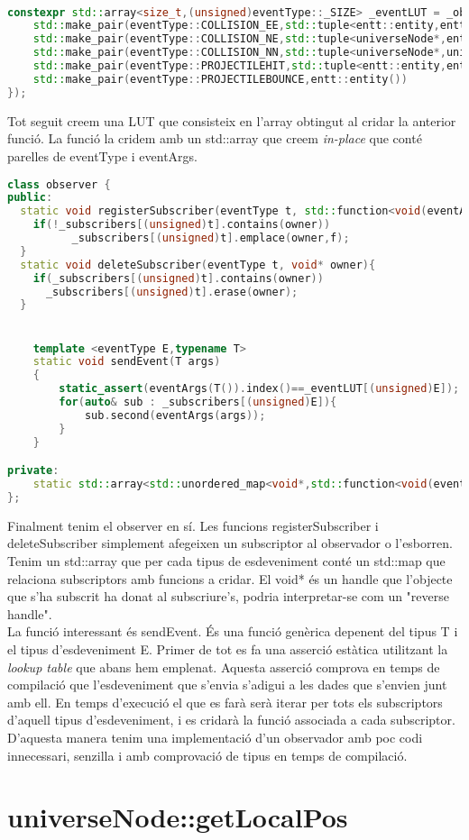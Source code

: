\\
\begin{lstlisting}[language=C++]
constexpr std::array<size_t,(unsigned)eventType::_SIZE> _eventLUT = _observertypetable(std::array<std::pair<eventType,eventArgs>,(unsigned)eventType::_SIZE>{
	std::make_pair(eventType::COLLISION_EE,std::tuple<entt::entity,entt::entity, double>()),
	std::make_pair(eventType::COLLISION_NE,std::tuple<universeNode*,entt::entity, double>()),
	std::make_pair(eventType::COLLISION_NN,std::tuple<universeNode*,universeNode*, double>()),
	std::make_pair(eventType::PROJECTILEHIT,std::tuple<entt::entity,entt::entity, double>()),
	std::make_pair(eventType::PROJECTILEBOUNCE,entt::entity())
});
\end{lstlisting}
Tot seguit creem una LUT que consisteix en l'array obtingut al cridar la anterior funció. La funció la cridem amb un std::array que creem \textit{in-place} que conté parelles de eventType i eventArgs.
\\
\begin{lstlisting}[language=C++]
class observer {
public:
  static void registerSubscriber(eventType t, std::function<void(eventArgs args)> f, void* owner){
    if(!_subscribers[(unsigned)t].contains(owner))
		  _subscribers[(unsigned)t].emplace(owner,f);
  }
  static void deleteSubscriber(eventType t, void* owner){
    if(_subscribers[(unsigned)t].contains(owner))
      _subscribers[(unsigned)t].erase(owner);
  }


	template <eventType E,typename T>
	static void sendEvent(T args)
	{
		static_assert(eventArgs(T()).index()==_eventLUT[(unsigned)E]);
		for(auto& sub : _subscribers[(unsigned)E]){
			sub.second(eventArgs(args));
		}
	}

private:
	static std::array<std::unordered_map<void*,std::function<void(eventArgs args)>>,(unsigned)eventType::_SIZE> _subscribers;
};
\end{lstlisting}
Finalment tenim el observer en sí. Les funcions registerSubscriber i deleteSubscriber simplement afegeixen un subscriptor al observador o l'esborren.
Tenim un std::array que per cada tipus de esdeveniment conté un std::map que relaciona subscriptors amb funcions a cridar. El void* és un handle que l'objecte que s'ha subscrit ha donat al subscriure's, podria interpretar-se com un "reverse handle".
\\
La funció interessant és sendEvent. És una funció genèrica depenent del tipus T i el tipus d'esdeveniment E. Primer de tot es fa una asserció estàtica utilitzant la \textit{lookup table} que abans hem emplenat. Aquesta asserció comprova en temps de compilació que l'esdeveniment que s'envia s'adigui a les dades que s'envien junt amb ell.
En temps d'execució el que es farà serà iterar per tots els subscriptors d'aquell tipus d'esdeveniment, i es cridarà la funció associada a cada subscriptor.
\\
D'aquesta manera tenim una implementació d'un observador amb poc codi innecessari, senzilla i amb comprovació de tipus en temps de compilació.
\section{universeNode::getLocalPos}
\section{}
